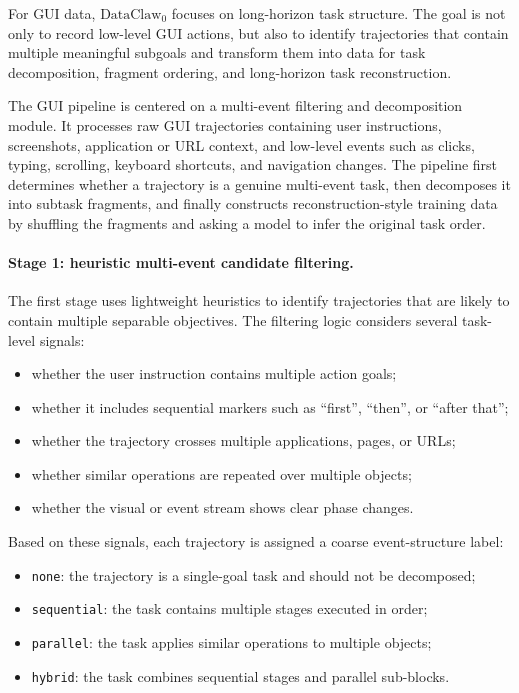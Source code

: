 For GUI data, $\text{DataClaw}_0$ focuses on long-horizon task structure. The goal is not only to record low-level GUI actions, but also to identify trajectories that contain multiple meaningful subgoals and transform them into data for task decomposition, fragment ordering, and long-horizon task reconstruction.

The GUI pipeline is centered on a multi-event filtering and decomposition module. It processes raw GUI trajectories containing user instructions, screenshots, application or URL context, and low-level events such as clicks, typing, scrolling, keyboard shortcuts, and navigation changes. The pipeline first determines whether a trajectory is a genuine multi-event task, then decomposes it into subtask fragments, and finally constructs reconstruction-style training data by shuffling the fragments and asking a model to infer the original task order.

\paragraph{Stage 1: heuristic multi-event candidate filtering.}
The first stage uses lightweight heuristics to identify trajectories that are likely to contain multiple separable objectives. The filtering logic considers several task-level signals:
\begin{itemize}
    \item whether the user instruction contains multiple action goals;
    \item whether it includes sequential markers such as ``first'', ``then'', or ``after that'';
    \item whether the trajectory crosses multiple applications, pages, or URLs;
    \item whether similar operations are repeated over multiple objects;
    \item whether the visual or event stream shows clear phase changes.
\end{itemize}

Based on these signals, each trajectory is assigned a coarse event-structure label:
\begin{itemize}
    \item \texttt{none}: the trajectory is a single-goal task and should not be decomposed;
    \item \texttt{sequential}: the task contains multiple stages executed in order;
    \item \texttt{parallel}: the task applies similar operations to multiple objects;
    \item \texttt{hybrid}: the task combines sequential stages and parallel sub-blocks.
\end{itemize}

